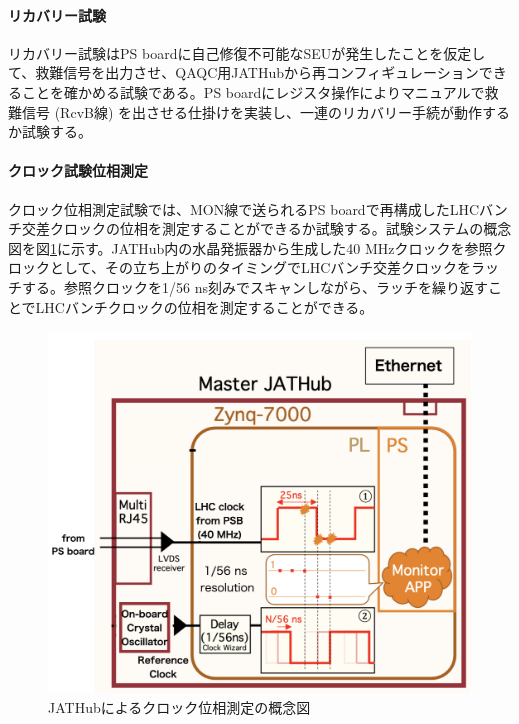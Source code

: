 \paragraph{リカバリー試験}\par
リカバリー試験はPS boardに自己修復不可能なSEUが発生したことを仮定して、救難信号を出力させ、QAQC用JATHubから再コンフィギュレーションできることを確かめる試験である。PS boardにレジスタ操作によりマニュアルで救難信号 (RcvB線) を出させる仕掛けを実装し、一連のリカバリー手続が動作するか試験する。
\baselineskip

\paragraph{クロック試験位相測定}\par
クロック位相測定試験では、MON線で送られるPS boardで再構成したLHCバンチ交差クロックの位相を測定することができるか試験する。試験システムの概念図を図\ref{JATHubclockmeasure}\cite{mt_atanaka}に示す。JATHub内の水晶発振器から生成した40 MHzクロックを参照クロックとして、その立ち上がりのタイミングでLHCバンチ交差クロックをラッチする。参照クロックを1/56 ns刻みでスキャンしながら、ラッチを繰り返すことでLHCバンチクロックの位相を測定することができる。
\baselineskip

\begin{figure} 
    \centering
    \includegraphics[width=16cm]{fig/QAQC/JATHubclockmasurement.png}
    \caption[JATHubによるクロック位相測定の概念図]{JATHubによるクロック位相測定の概念図\cite{mt_atanaka}}
    \label{JATHubclockmeasure}
\end{figure}    

